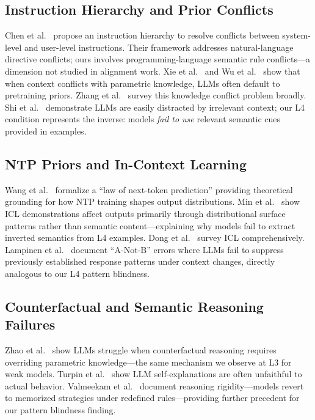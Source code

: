\subsection{Instruction Hierarchy and Prior Conflicts}
Chen et al.~\cite{chen2024instructhierarchy} propose an instruction hierarchy to resolve conflicts between system-level and user-level instructions. Their framework addresses natural-language directive conflicts; ours involves programming-language semantic rule conflicts---a dimension not studied in alignment work.
Xie et al.~\cite{xie2024conflict} and Wu et al.~\cite{wu2024contextparametric} show that when context conflicts with parametric knowledge, LLMs often default to pretraining priors. Zhang et al.~\cite{zhang2024conflict} survey this knowledge conflict problem broadly. Shi et al.~\cite{contextinvert2024} demonstrate LLMs are easily distracted by irrelevant context; our L4 condition represents the inverse: models \emph{fail to use} relevant semantic cues provided in examples.

\subsection{NTP Priors and In-Context Learning}
Wang et al.~\cite{wang2024ntp} formalize a ``law of next-token prediction'' providing theoretical grounding for how NTP training shapes output distributions. Min et al.~\cite{min2022rethinking} show ICL demonstrations affect outputs primarily through distributional surface patterns rather than semantic content---explaining why models fail to extract inverted semantics from L4 examples. Dong et al.~\cite{dong2022survey} survey ICL comprehensively. Lampinen et al.~\cite{anotb2024} document ``A-Not-B'' errors where LLMs fail to suppress previously established response patterns under context changes, directly analogous to our L4 pattern blindness.

\subsection{Counterfactual and Semantic Reasoning Failures}
Zhao et al.~\cite{counterfact2024} show LLMs struggle when counterfactual reasoning requires overriding parametric knowledge---the same mechanism we observe at L3 for weak models. Turpin et al.~\cite{semanticinvar2024} show LLM self-explanations are often unfaithful to actual behavior. Valmeekam et al.~\cite{reasoningrigidity2024} document reasoning rigidity---models revert to memorized strategies under redefined rules---providing further precedent for our pattern blindness finding.


